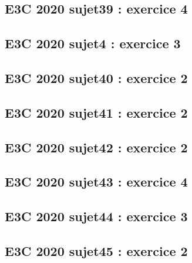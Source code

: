 \documentclass[lang=fr,edition=teacher,layout=sheet]{mxbook}
\begin{document}
\subsection*{E3C 2020 sujet39 : exercice 4}
\begingroup\endgroup
\par\bigskip
{}\subsection*{E3C 2020 sujet4 : exercice 3}
\begingroup\endgroup
\par\bigskip
{}\subsection*{E3C 2020 sujet40 : exercice 2}
\begingroup\endgroup
\par\bigskip
{}\subsection*{E3C 2020 sujet41 : exercice 2}
\begingroup\endgroup
\par\bigskip
{}\subsection*{E3C 2020 sujet42 : exercice 2}
\begingroup\endgroup
\par\bigskip
{}\subsection*{E3C 2020 sujet43 : exercice 4}
\begingroup\endgroup
\par\bigskip
{}\subsection*{E3C 2020 sujet44 : exercice 3}
\begingroup\endgroup
\par\bigskip
{}\subsection*{E3C 2020 sujet45 : exercice 2}
\end{document}
